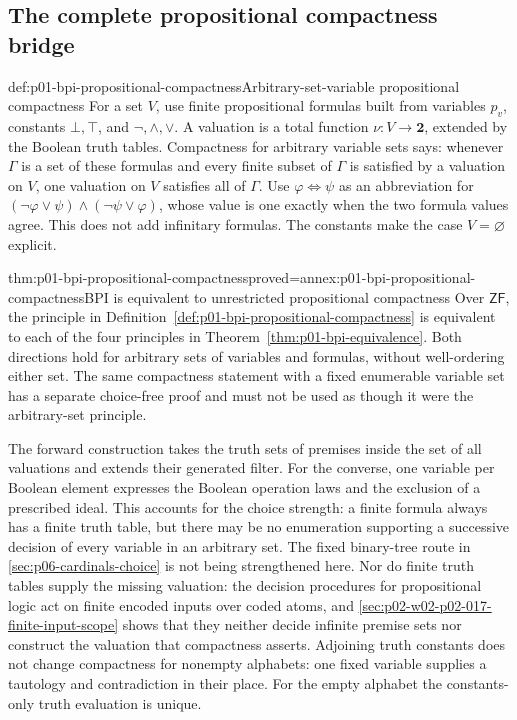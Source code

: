 \subsection{The complete propositional compactness bridge}
\label{sec:p01-bpi-compactness-bridge}

\begin{hbdefinition}{def:p01-bpi-propositional-compactness}{Arbitrary-set-variable propositional compactness}
For a set \(V\), use finite propositional formulas built from variables
\(p_v\), constants \(\bot,\top\), and
\(\neg,\land,\lor\). A valuation is a total function
\(\nu:V\to\mathbf2\), extended by the Boolean truth tables.
Compactness for arbitrary variable sets says: whenever
\(\Gamma\) is a set of these formulas and every finite subset of
\(\Gamma\) is satisfied by a valuation on \(V\), one valuation on
\(V\) satisfies all of \(\Gamma\). Use
\(\varphi\Leftrightarrow\psi\) as an abbreviation for
\((\neg\varphi\lor\psi)\land(\neg\psi\lor\varphi)\), whose value
is one exactly when the two formula values agree. This does not add
infinitary formulas. The constants make the case
\(V=\varnothing\) explicit.
\end{hbdefinition}

\begin{hbtheorem}{thm:p01-bpi-propositional-compactness}{proved=annex:p01-bpi-propositional-compactness}{BPI is equivalent to unrestricted propositional compactness}
Over \(\mathsf{ZF}\), the principle in
Definition~\ref{def:p01-bpi-propositional-compactness} is equivalent to
each of the four principles in Theorem~\ref{thm:p01-bpi-equivalence}.
Both directions hold for arbitrary sets of variables and formulas, without
well-ordering either set. The same compactness statement with a fixed
enumerable variable set has a separate choice-free proof and must not be
used as though it were the arbitrary-set principle.
\end{hbtheorem}

The forward construction takes the truth sets of premises inside the set
of all valuations and extends their generated filter. For the converse,
one variable per Boolean element expresses the Boolean operation laws and
the exclusion of a prescribed ideal. This accounts for the choice strength:
a finite formula always has a finite truth table, but there may be no
enumeration supporting a successive decision of every variable in an
arbitrary set. The fixed binary-tree route in
\cref{sec:p06-cardinals-choice} is not being strengthened here.
Nor do finite truth tables supply the missing valuation: the decision
procedures for propositional logic act on finite encoded inputs over
coded atoms, and \cref{sec:p02-w02-p02-017-finite-input-scope} shows that
they neither decide infinite premise sets nor construct the valuation
that compactness asserts.
Adjoining truth constants does not change compactness for nonempty alphabets:
one fixed variable supplies a tautology and contradiction in their place.
For the empty alphabet the constants-only truth evaluation is unique.

